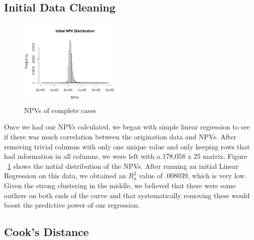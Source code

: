 \documentclass[12 pt]{uncw_thesis}
\theoremstyle{plain}
\theoremstyle{remark}
\theoremstyle{definition}
\begin{document}
\subsection{Initial Data Cleaning}
\begin{figure}
	\vspace{-2cm}
	\centering
	\includegraphics[width=0.45\textwidth]{images/InitalNPVs.jpeg}
	\caption{NPVs of complete cases}
	\label{fig:InitialNPVs}
\end{figure}
Once we had our NPVs calculated, we began with simple linear regression to see if there was much correlation between the origination data and NPVs. After removing trivial columns with only  one unique value and only keeping rows that had information in all columns, we were left with a 178,058 x 25 matrix. Figure ~\ref{fig:InitialNPVs} shows the initial distribution of the NPVs.  After running an initial Linear Regression on this data, we obtained an \(R_a^2\) value of .008039, which is very low. Given the strong clustering in the middle, we believed that there were some outliers on both ends of the curve and that systematically removing these would boost the predictive power of our regression. 
\subsection{Cook's Distance}
\end{document}
